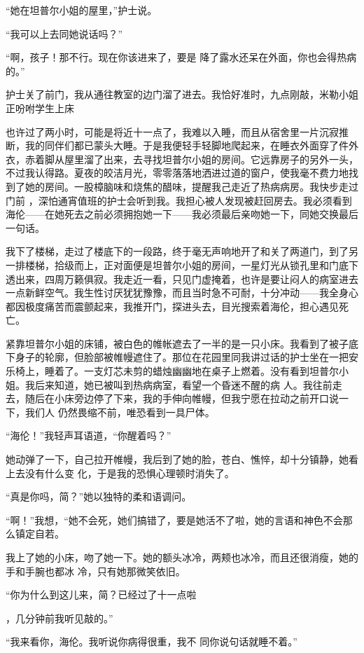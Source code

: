 \documentclass{article}
\begin{document}
“她在坦普尔小姐的屋里，”护士说。 


“我可以上去同她说话吗？” 

“啊，孩子！那不行。现在你该进来了，要是
降了露水还呆在外面，你也会得热病的。” 

护士关了前门，我从通往教室的边门溜了进去。我恰好准时，九点刚敲，米勒小姐正吩咐学生上床

也许过了两小时，可能是将近十一点了，我难以入睡，而且从宿舍里一片沉寂推断，我的同伴们都已蒙头大睡。于是我便轻手轻脚地爬起来，在睡衣外面穿了件外衣，赤着脚从屋里溜了出来，去寻找坦普尔小姐的房间。它远靠房子的另外一头，不过我认得路。夏夜的皎洁月光，零零落落地洒进过道的窗户，使我毫不费力地找到了她的房间。一股樟脑味和烧焦的醋味，提醒我己走近了热病病房。我快步走过门前
\newpage
，深怕通宵值班的护士会听到我。我担心被人发现被赶回房去。我必须看到海伦——在她死去之前必须拥抱她一下——我必须最后亲吻她一下，同她交换最后
一句话。 

我下了楼梯，走过了楼底下的一段路，终于毫无声响地开了和关了两道门，到了另一排楼梯，拾级而上，正对面便是坦普尔小姐的房间，一星灯光从锁孔里和门底下透出来，四周万籁俱寂。我走近一看，只见门虚掩着，也许是要让闷人的病室进去一点新鲜空气。我生性讨厌犹犹豫豫，而且当时急不可耐，十分冲动——我全身心都因极度痛苦而震颤起来，我推开门，探进头去，目光搜索着海伦，担心遇见死亡。
 

紧靠坦普尔小姐的床铺，被白色的帷帐遮去了一半的是一只小床。我看到了被子底下身子的轮廓，但脸部被帷幔遮住了。那位在花园里同我讲过话的护士坐在一把安乐椅上，睡着了。一支灯芯未剪的蜡烛幽幽地在桌子上燃着。没有看到坦普尔小姐。我后来知道，她已被叫到热病病室，看望一个昏迷不醒的病
\newpage
人。我往前走去，随后在小床旁边停了下来，我的手伸向帷幔，但我宁愿在拉动之前开口说一下，我们人
仍然畏缩不前，唯恐看到一具尸体。 


“海伦！”我轻声耳语道，“你醒着吗？” 

她动弹了一下，自己拉开帷幔，我后到了她的脸，苍白、憔悴，却十分镇静，她看上去没有什么变
化，于是我的恐惧心理顿时消失了。 

“真是你吗，简？”她以独特的柔和语调问。

“啊！”我想，“她不会死，她们搞错了，要是她活不了啦，她的言语和神色不会那么镇定自若。

我上了她的小床，吻了她一下。她的额头冰冷，两颊也冰冷，而且还很消瘦，她的手和手腕也都冰
冷，只有她那微笑依旧。 

“你为什么到这儿来，简？已经过了十一点啦

\newpage
，几分钟前我听见敲的。” 

“我来看你，海伦。我听说你病得很重，我不
同你说句话就睡不着。” 
\end{document}

